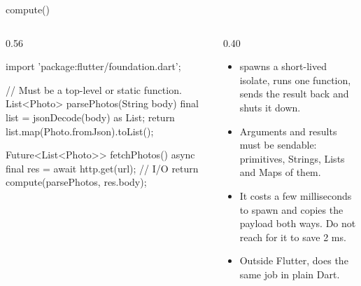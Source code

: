 \documentclass[10pt,aspectratio=169,t]{beamer}
\begin{document}
\begin{frame}[fragile,eyebrow=Isolates]{compute()}
  \begin{columns}[T]
    \begin{column}{0.56\textwidth}
\begin{dart}
import 'package:flutter/foundation.dart';

// Must be a top-level or static function.
List<Photo> parsePhotos(String body) {
  final list = jsonDecode(body) as List;
  return list.map(Photo.fromJson).toList();
}

Future<List<Photo>> fetchPhotos() async {
  final res = await http.get(url);   // I/O
  return compute(parsePhotos, res.body);
}
\end{dart}
    \end{column}
    \begin{column}{0.40\textwidth}
      \begin{itemize}
        \item {} spawns a short-lived isolate, runs one function, sends the result back and shuts it down.
        \item Arguments and results must be sendable: primitives, Strings, Lists and Maps of them.
        \item It costs a few milliseconds to spawn and copies the payload both ways. Do not reach for it to save 2 ms.
        \item Outside Flutter,  does the same job in plain Dart.
      \end{itemize}
    \end{column}
  \end{columns}
\end{frame}
\end{document}
